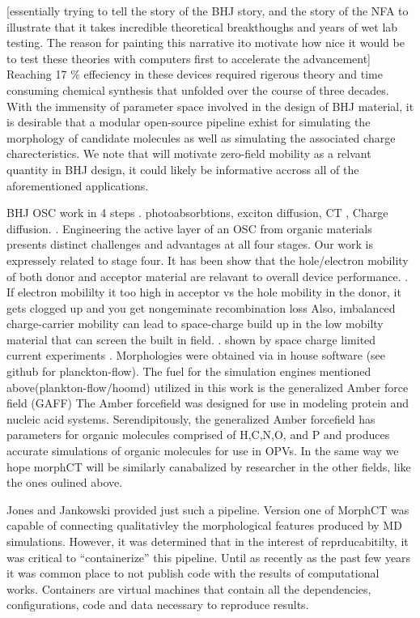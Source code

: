 [essentially trying to tell the story of the BHJ story, and the story of the NFA to illustrate that it takes
incredible theoretical breakthoughs and years of wet lab testing. The reason for painting this narrative ito
motivate how nice it would be to test these theories with computers first to accelerate the
advancement]
Reaching 17 \% effeciency in these devices required rigerous theory and time consuming chemical synthesis
that unfolded over the course of three decades. 
With the immensity of parameter space involved in the design of BHJ material, it is desirable that a modular
open-source pipeline exhist for simulating the morphology of candidate molecules as well as simulating the 
associated charge charecteristics. We note that will motivate zero-field mobility as a relvant quantity in BHJ
design, it could likely be informative accross all of the aforementioned applications. 


BHJ OSC work in 4 steps . photoabsorbtions, exciton diffusion, CT , Charge diffusion. \citet{Fusella2019}.
Engineering the active layer of an OSC from organic materials presents distinct challenges and advantages at
all four stages. 
\indent Our work is expressely related to stage four. It has been show that the hole/electron mobility of both donor and acceptor material are
relavant to overall device performance. \cite{Wang2019e}. If electron mobililty it too high
in acceptor vs the hole mobility in the donor, it gets clogged up and you get nongeminate recombination loss
Also, imbalanced charge-carrier mobility can lead to space-charge build up in the low mobilty material that
can screen the built in field.  \cite{Bartelt2015}. shown by space charge limited current experiments
\cite{Small2013}.
Morphologies were obtained via in house software (see github for planckton-flow).  The
fuel for the simulation engines mentioned above(plankton-flow/hoomd) utilized in this work is the generalized
Amber force field (GAFF)\cite{Wang2004a} The Amber forcefield was designed for use in modeling protein and
nucleic acid systems.  Serendipitously, the generalized Amber forcefield has parameters for organic molecules
comprised of H,C,N,O, and P and produces accurate simulations of organic molecules for use in OPVs. In the
same way we hope morphCT will be similarly canabalized by researcher in the other fields, like the ones oulined above. 


\indent Jones and Jankowski provided just such a pipeline. Version one of MorphCT was capable of
connecting qualitativley the morphological features produced by MD simulations. However, it was determined
that in the interest of reprducabitilty, it was critical to ``containerize'' this pipeline. Until as recently as
the past few years it was common place to not publish code with the results of computational works. Containers
are virtual machines that contain all the dependencies, configurations, code and data necessary to reproduce
results. \cite{Cito2016a}

